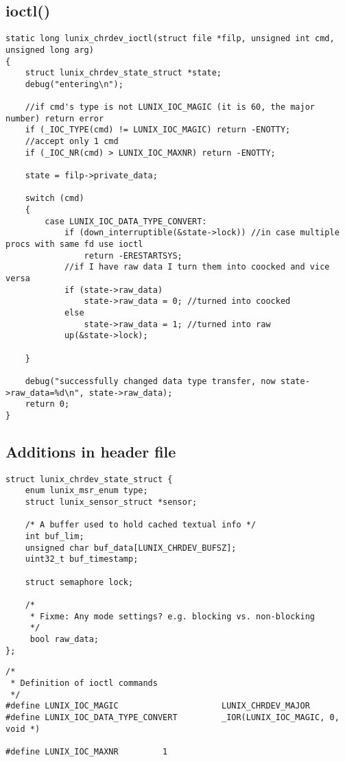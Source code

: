 \documentclass[a4paper]{article}
\begin{document}
\subsection*{ioctl()}
\label{sec:ioctl}
\begin{lstlisting}[style=CStyle]
static long lunix_chrdev_ioctl(struct file *filp, unsigned int cmd, unsigned long arg)
{
    struct lunix_chrdev_state_struct *state;
    debug("entering\n");

    //if cmd's type is not LUNIX_IOC_MAGIC (it is 60, the major number) return error
    if (_IOC_TYPE(cmd) != LUNIX_IOC_MAGIC) return -ENOTTY;
    //accept only 1 cmd
    if (_IOC_NR(cmd) > LUNIX_IOC_MAXNR) return -ENOTTY;

    state = filp->private_data;

    switch (cmd)
    {
        case LUNIX_IOC_DATA_TYPE_CONVERT:
            if (down_interruptible(&state->lock)) //in case multiple procs with same fd use ioctl
                return -ERESTARTSYS;
            //if I have raw data I turn them into coocked and vice versa
            if (state->raw_data)
                state->raw_data = 0; //turned into coocked
            else
                state->raw_data = 1; //turned into raw
            up(&state->lock);

    }

    debug("successfully changed data type transfer, now state->raw_data=%d\n", state->raw_data);
	return 0;
}
\end{lstlisting}

\subsection*{Additions in header file}
\label{sec:header file}
\begin{lstlisting}[style=CStyle]
struct lunix_chrdev_state_struct {
	enum lunix_msr_enum type;
	struct lunix_sensor_struct *sensor;

	/* A buffer used to hold cached textual info */
	int buf_lim;
	unsigned char buf_data[LUNIX_CHRDEV_BUFSZ];
	uint32_t buf_timestamp;

	struct semaphore lock;

	/*
	 * Fixme: Any mode settings? e.g. blocking vs. non-blocking
	 */
     bool raw_data;
};
\end{lstlisting}


\begin{lstlisting}[style=CStyle]
/*
 * Definition of ioctl commands
 */
#define LUNIX_IOC_MAGIC		               	LUNIX_CHRDEV_MAJOR
#define LUNIX_IOC_DATA_TYPE_CONVERT   		_IOR(LUNIX_IOC_MAGIC, 0, void *)

#define LUNIX_IOC_MAXNR			1
\end{lstlisting}
\end{document}
